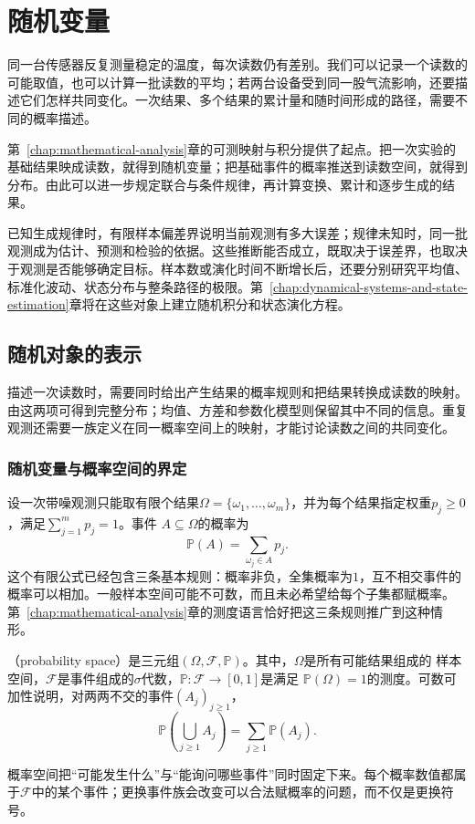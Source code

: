 \chapter{随机变量}
\label{chap:random-variables}
\label{chap:probability-theory}
\label{chap:stochastic-processes-and-approximation}
\label{chap:mathematical-statistics}

同一台传感器反复测量稳定的温度，每次读数仍有差别。我们可以记录一个读数的可能取值，也可以计算一批读数的平均；若两台设备受到同一股气流影响，还要描述它们怎样共同变化。一次结果、多个结果的累计量和随时间形成的路径，需要不同的概率描述。

第~\ref{chap:mathematical-analysis}章的可测映射与积分提供了起点。把一次实验的基础结果映成读数，就得到随机变量；把基础事件的概率推送到读数空间，就得到分布。由此可以进一步规定联合与条件规律，再计算变换、累计和逐步生成的结果。

已知生成规律时，有限样本偏差界说明当前观测有多大误差；规律未知时，同一批观测成为估计、预测和检验的依据。这些推断能否成立，既取决于误差界，也取决于观测是否能够确定目标。样本数或演化时间不断增长后，还要分别研究平均值、标准化波动、状态分布与整条路径的极限。第~\ref{chap:dynamical-systems-and-state-estimation}章将在这些对象上建立随机积分和状态演化方程。

\section{随机对象的表示}
\label{sec:rv-definition}
\label{sec:probability-representation-conditioning}
描述一次读数时，需要同时给出产生结果的概率规则和把结果转换成读数的映射。由这两项可得到完整分布；均值、方差和参数化模型则保留其中不同的信息。重复观测还需要一族定义在同一概率空间上的映射，才能讨论读数之间的共同变化。

\subsection{随机变量与概率空间的界定}
\label{sec:probability-spaces-random-variables}
设一次带噪观测只能取有限个结果\(\Omega=\{\omega_1,\ldots,\omega_m\}\)，并为每个结果指定权重\(p_j\geq0\)，满足\(\sum_{j=1}^{m}p_j=1\)。事件
\(A\subseteq\Omega\)的概率为
\[ \mathbb{P}(A)=\sum_{\omega_j\in A}p_j. \]
这个有限公式已经包含三条基本规则：概率非负，全集概率为\(1\)，互不相交事件的概率可以相加。一般样本空间可能不可数，而且未必希望给每个子集都赋概率。第~\ref{chap:mathematical-analysis}章的测度语言恰好把这三条规则推广到这种情形。

\begin{definition}[概率空间]
  \label{def:probability-space}
（probability space）是三元组\((\Omega,\mathcal{F},\mathbb{P})\)。其中，\(\Omega\)是所有可能结果组成的
样本空间，\(\mathcal{F}\)是事件组成的\(\sigma\)代数，\(\mathbb{P}:\mathcal{F}\to[0,1]\)是满足
\(\mathbb{P}(\Omega)=1\)的测度。可数可加性说明，对两两不交的事件\((A_j)_{j\geq1}\)，
\[ \mathbb{P}\left(\bigcup_{j\geq1}A_j\right)
  =\sum_{j\geq1}\mathbb{P}(A_j). \]
\end{definition}
概率空间把“可能发生什么”与“能询问哪些事件”同时固定下来。每个概率数值都属于\(\mathcal F\)中的某个事件；更换事件族会改变可以合法赋概率的问题，而不仅是更换符号。

